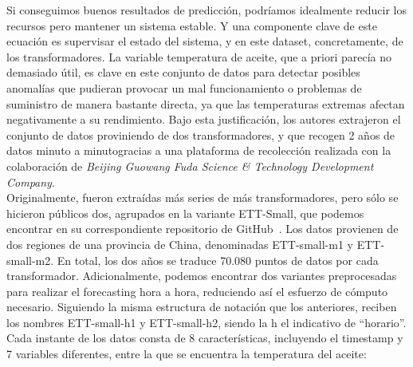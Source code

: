 Si conseguimos buenos resultados de predicción, podríamos idealmente reducir los recursos pero mantener un sistema estable. Y una componente clave de este ecuación es supervisar el estado del sistema, y en este dataset, concretamente, de los transformadores. La variable temperatura de aceite, que a priori parecía no demasiado útil, es clave en este conjunto de datos para detectar posibles anomalías que pudieran provocar un mal funcionamiento o problemas de suministro de manera bastante directa, ya que las temperaturas extremas afectan negativamente a su rendimiento. Bajo esta justificación, los autores extrajeron el conjunto de datos proviniendo de dos transformadores, y que recogen 2 años de datos minuto a minutogracias a una plataforma de recolección realizada con la colaboración de \textit{Beijing Guowang Fuda Science \& Technology Development Company}.\\

Originalmente, fueron extraídas más series de más transformadores, pero sólo se hicieron públicos dos, agrupados en la variante ETT-Small, que podemos encontrar en su correspondiente repositorio de GitHub~\cite{zhou2021etdataset}. Los datos provienen de dos regiones de una provincia de China, denominadas ETT-small-m1 y ETT-small-m2. En total, los dos años se traduce 70.080 puntos de datos por cada transformador. Adicionalmente, podemos encontrar dos variantes preprocesadas para realizar el forecasting hora a hora, reduciendo así el esfuerzo de cómputo necesario. Siguiendo la misma estructura de notación que los anteriores, reciben los nombres ETT-small-h1 y ETT-small-h2, siendo la h el indicativo de ``horario''.\\

Cada instante de los datos consta de 8 características, incluyendo el timestamp y 7 variables diferentes, entre la que se encuentra la temperatura del aceite:


